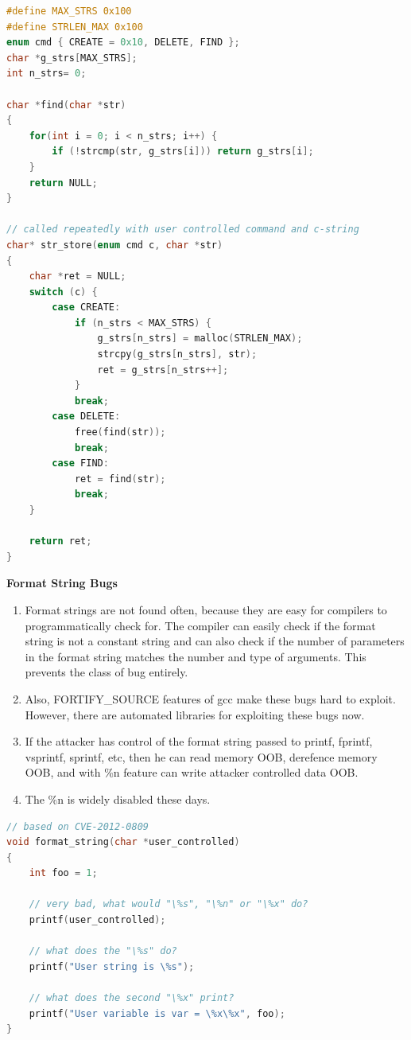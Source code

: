 \documentclass[12pt]{Training}
\begin{document}
\begin{sectionbox}
\begin{lstlisting}[language=C, caption={Heap Corruption}]
#define MAX_STRS 0x100
#define STRLEN_MAX 0x100
enum cmd { CREATE = 0x10, DELETE, FIND };
char *g_strs[MAX_STRS];
int n_strs= 0;

char *find(char *str)
{
    for(int i = 0; i < n_strs; i++) {
        if (!strcmp(str, g_strs[i])) return g_strs[i];
    }   
    return NULL;
}

// called repeatedly with user controlled command and c-string
char* str_store(enum cmd c, char *str)
{
    char *ret = NULL;
    switch (c) {
        case CREATE:
            if (n_strs < MAX_STRS) {
                g_strs[n_strs] = malloc(STRLEN_MAX);
                strcpy(g_strs[n_strs], str);
                ret = g_strs[n_strs++];
            }
            break;
        case DELETE:
            free(find(str));
            break;
        case FIND:
            ret = find(str);
            break;
    }   

    return ret;
}
\end{lstlisting}
\end{sectionbox}

\textbf{Format String Bugs}
\begin{enumerate}
    \item Format strings are not found often, because they are easy for compilers to programmatically check for. The compiler can easily check if the format string is not a constant string and can also check if the number of parameters in the format string matches the number and type of arguments. This prevents the class of bug entirely.
    \item Also, FORTIFY\_SOURCE features of gcc make these bugs hard to exploit. However, there are automated libraries for exploiting these bugs now. 
    \item If the attacker has control of the format string passed to printf, fprintf, vsprintf, sprintf, etc, then he can read memory OOB, derefence memory OOB, and with \%n feature can write attacker controlled data OOB.
    \item The \%n is widely disabled these days.
\end{enumerate}
\begin{sectionbox}
\begin{lstlisting}[language=C, caption={Format Strings}]
// based on CVE-2012-0809
void format_string(char *user_controlled)
{
    int foo = 1;

    // very bad, what would "\%s", "\%n" or "\%x" do?
    printf(user_controlled); 

    // what does the "\%s" do?
    printf("User string is \%s");

    // what does the second "\%x" print?
    printf("User variable is var = \%x\%x", foo);
}
\end{lstlisting}
\end{sectionbox}
\end{document}

